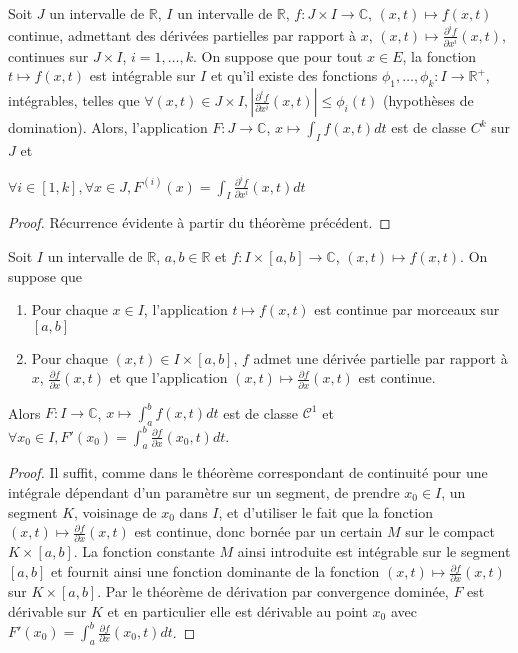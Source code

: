\begin{cor}
Soit $J$ un intervalle de $\mathbb{R}$, $I$ un intervalle de $\mathbb{R}$, $f : J \times I \to \mathbb{C}$, $(x,t) \mapsto f(x,t)$ continue, admettant des dérivées partielles par rapport à $x$, $(x,t) \mapsto \frac{\partial^i f}{\partial x^i}(x,t)$, continues sur $J \times I$, $i = 1,\ldots,k$. On suppose que pour tout $x \in E$, la fonction $t \mapsto f(x,t)$ est intégrable sur $I$ et qu'il existe des fonctions $\phi_1,\ldots,\phi_k : I \to \mathbb{R}^+$, intégrables, telles que $\forall (x,t) \in J \times I, |\frac{\partial^i f}{\partial x^i}(x,t)| \leq \phi_i(t)$ (hypothèses de domination). Alors, l'application $F : J \to \mathbb{C}$, $x \mapsto \int_I f(x,t) dt$ est de classe $C^k$ sur $J$ et

$\forall i \in [1,k], \forall x \in J, F^{(i)}(x) = \int_I \frac{\partial^i f}{\partial x^i}(x,t) dt$
\end{cor}

\begin{proof}
Récurrence évidente à partir du théorème précédent.
\end{proof}

\begin{thm}
Soit $I$ un intervalle de $\mathbb{R}$, $a,b \in \mathbb{R}$ et $f : I \times [a,b] \to \mathbb{C}$, $(x,t) \mapsto f(x,t)$. On suppose que
\begin{enumerate}
  \item Pour chaque $x \in I$, l'application $t \mapsto f(x,t)$ est continue par morceaux sur $[a,b]$
  \item Pour chaque $(x,t) \in I \times [a,b]$, $f$ admet une dérivée partielle par rapport à $x$, $\frac{\partial f}{\partial x}(x,t)$ et que l'application $(x,t) \mapsto \frac{\partial f}{\partial x}(x,t)$ est continue.
\end{enumerate}
Alors $F : I \to \mathbb{C}$, $x \mapsto \int_a^b f(x,t) dt$ est de classe $\mathcal{C}^1$ et $\forall x_0 \in I, F'(x_0) = \int_a^b \frac{\partial f}{\partial x}(x_0,t) dt$.
\end{thm}

\begin{proof}
Il suffit, comme dans le théorème correspondant de continuité pour une intégrale dépendant d'un paramètre sur un segment, de prendre $x_0 \in I$, un segment $K$, voisinage de $x_0$ dans $I$, et d'utiliser le fait que la fonction $(x,t) \mapsto \frac{\partial f}{\partial x}(x,t)$ est continue, donc bornée par un certain $M$ sur le compact $K \times [a,b]$. La fonction constante $M$ ainsi introduite est intégrable sur le segment $[a,b]$ et fournit ainsi une fonction dominante de la fonction $(x,t) \mapsto \frac{\partial f}{\partial x}(x,t)$ sur $K \times [a,b]$. Par le théorème de dérivation par convergence dominée, $F$ est dérivable sur $K$ et en particulier elle est dérivable au point $x_0$ avec $F'(x_0) = \int_a^b \frac{\partial f}{\partial x}(x_0,t) dt$.
\end{proof}

